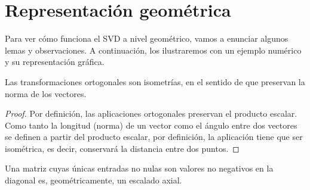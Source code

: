 \section{Representación geométrica}

Para ver cómo funciona  el SVD a nivel geométrico, vamos a enunciar algunos lemas y observaciones. A continuación, los ilustraremos con un ejemplo numérico y su representación gráfica.\\

\begin{lemma}Las transformaciones ortogonales son isometrías, en el sentido de que preservan la norma de los vectores.
\end{lemma}

\begin{proof} Por definición, las aplicaciones ortogonales preservan el producto escalar. Como tanto la longitud (norma) de un vector como el ángulo entre dos vectores se definen a partir del producto escalar, por definición, la aplicación tiene que ser isométrica, es decir, conservará la distancia entre dos puntos.
\end{proof}

\begin{lemma} Una matriz cuyas únicas entradas no nulas son valores no negativos en la diagonal es, geométricamente, un escalado axial.
\end{lemma}


